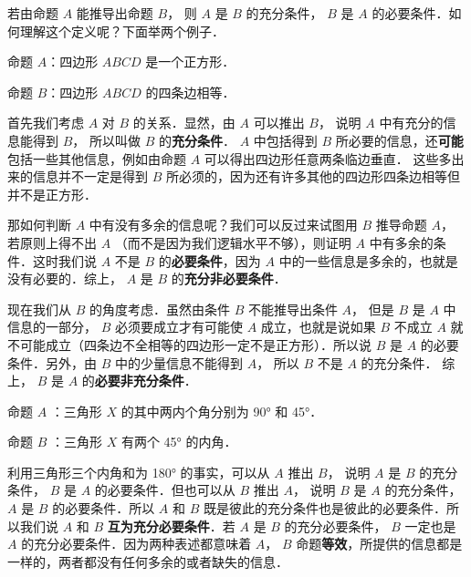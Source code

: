

若由命题 $A$ 能推导出命题 $B$， 则 $A$ 是 $B$ 的充分条件， $B$ 是 $A$ 的必要条件．如何理解这个定义呢？下面举两个例子．

\begin{example}{}
命题 $A$：四边形 $ABCD$ 是一个正方形．

命题 $B$：四边形 $ABCD$ 的四条边相等．

首先我们考虑 $A$ 对 $B$ 的关系．显然，由 $A$ 可以推出 $B$， 说明 $A$ 中有充分的信息能得到 $B$， 所以叫做 $B$ 的\textbf{充分条件}． $A$ 中包括得到 $B$ 所必要的信息，还\textbf{可能}包括一些其他信息，例如由命题 $A$ 可以得出四边形任意两条临边垂直． 这些多出来的信息并不一定是得到 $B$ 所必须的，因为还有许多其他的四边形四条边相等但并不是正方形．

那如何判断 $A$ 中有没有多余的信息呢？我们可以反过来试图用 $B$ 推导命题 $A$， 若原则上得不出 $A$ （而不是因为我们逻辑水平不够），则证明 $A$ 中有多余的条件．这时我们说 $A$ 不是 $B$ 的\textbf{必要条件}，因为 $A$ 中的一些信息是多余的，也就是没有必要的．综上， $A$ 是 $B$ 的\textbf{充分非必要条件}．

现在我们从 $B$ 的角度考虑．虽然由条件 $B$ 不能推导出条件 $A$， 但是 $B$ 是 $A$ 中信息的一部分， $B$ 必须要成立才有可能使 $A$ 成立，也就是说如果 $B$ 不成立 $A$ 就不可能成立（四条边不全相等的四边形一定不是正方形）．所以说 $B$ 是 $A$ 的必要条件．另外，由 $B$ 中的少量信息不能得到 $A$， 所以 $B$ 不是 $A$ 的充分条件． 综上， $B$ 是 $A$ 的\textbf{必要非充分条件}．
\end{example}


\begin{example}{}
命题 $A$ ：三角形 $X$ 的其中两内个角分别为 90° 和 45°．

命题 $B$ ：三角形 $X$ 有两个 45° 的内角．

利用三角形三个内角和为 180° 的事实，可以从 $A$ 推出 $B$， 说明 $A$ 是 $B$ 的充分条件， $B$ 是 $A$ 的必要条件．但也可以从 $B$ 推出 $A$， 说明 $B$ 是 $A$ 的充分条件， $A$ 是 $B$ 的必要条件．所以 $A$ 和 $B$ 既是彼此的充分条件也是彼此的必要条件．所以我们说 $A$ 和 $B$ \textbf{互为充分必要条件}．若 $A$ 是 $B$ 的充分必要条件， $B$ 一定也是 $A$ 的充分必要条件．因为两种表述都意味着 $A$，  $B$ 命题\textbf{等效}，所提供的信息都是一样的，两者都没有任何多余的或者缺失的信息．
\end{example}

